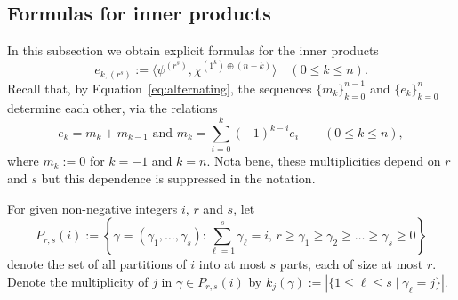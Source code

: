 	
\subsection{Formulas for inner products}\label{sec:e}
	
In this subsection we obtain explicit formulas for the inner products 
\[
    e_{k,(r^s)} := \langle \psi^{(r^s)}, \chi^{(1^k) \oplus (n-k)} \rangle
    \quad (0 \le k \le n).
\]
Recall that, by Equation~\eqref{eq:alternating}, 
the sequences $\{m_k\}_{k=0}^{n-1}$ and $\{e_k\}_{k=0}^{n}$ 
determine each other, via the relations
\[
    e_k = m_k+m_{k-1}
    \text{ and }
    m_k = \sum_{i=0}^k (-1)^{k-i} e_i
    \qquad (0 \le k \le n),
\]
where $m_k := 0$ for $k = -1$ and $k = n$.
Nota bene, these multiplicities depend on $r$ and $s$
but this dependence is suppressed in the notation.

\begin{definition}\label{def:partition}
    For given non-negative integers $i$, $r$ and $s$, let
    \[
        P_{r,s}(i) 
        := \left\{ \gamma=(\gamma_1,\ldots,\gamma_s) :
        \sum_{\ell = 1}^{s} \gamma_\ell = i,\, r \ge \gamma_1 \ge \gamma_2 \ge \ldots \ge \gamma_s \ge 0 \right\}
    \]
    denote the set of all partitions of $i$ into at most $s$ parts, each of size at most $r$. 
    Denote the multiplicity of $j$ in $\gamma \in P_{r,s}(i)$ by 
    $k_j(\gamma) := |\{1 \leq \ell \leq s \mid \gamma_\ell=j\}|$.
\end{definition}
	

